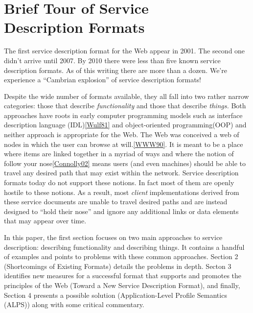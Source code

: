 \documentclass{wsrest2014}
\begin{document}
\section{Brief Tour of Service\\Description Formats}
\label{_brief_tour_of_service_description_formats}
 \par{}The first service description format for the Web appear in 2001. The second one didn't arrive until 2007. By 2010 there were less than five known service description formats. As of this writing there are more than a dozen. We're experience a ``Cambrian explosion'' of service description formats!
 \par{}Despite the wide number of formats available, they all fall into two rather narrow categories: those that describe \emph{functionality} and those that describe \emph{things.} Both approaches have roots in early computer programming models such as interface description language (IDL)\hyperlink{Wulf81}{[Wulf81]} and object-oriented programming(OOP) and neither approach is appropriate for the Web. The Web was conceived \textquotedbl{}a web of nodes in which the user can browse at will.\textquotedbl{}\hyperlink{WWW90}{[WWW90]}. It is meant to be a place where items are linked together in a myriad of ways and where the notion of \textquotedbl{}follow your nose\textquotedbl{}\hyperlink{Connolly02}{[Connolly02]} means users (and even machines) should be able to travel any desired path that may exist within the network. Service description formats today do not support these notions. In fact most of them are openly hostile to these notions. As a result, most \emph{client} implementations derived from these service documents are unable to travel desired paths and are instead designed to ``hold their nose'' and ignore any  additional links or data elements that may appear over time.
 \par{}In this paper, the first section focuses on two main approaches to service description: describing functionality and describing things. It contains a handful of examples and points to problems with these common approaches. Section 2 (Shortcomings of Existing Formats) details the problems in depth. Secton 3 identifies new measures for a successful format that supports and promotes the principles of the Web (Toward a New Service Description Format), and finally, Section 4 presents a possible solution (Application-Level Profile Semantics (ALPS)) along with some critical commentary.
\hypertarget{_describing_functionality}{}
\end{document}
